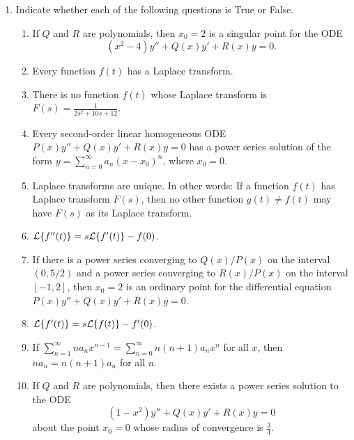 \documentclass[12pt]{article}
\theoremstyle{definition}
\theoremstyle{underl}
\begin{document}
\begin{enumerate}[topsep=0.125in,itemsep=0.375in]
		\item Indicate whether each of the following questions is True or False.
			\begin{enumerate}[itemsep=3mm]		
				\item If $Q$ and $R$ are polynomials, then $x_0=2$ is a singular point for the ODE \[(x^2-4)y''+Q(x)y'+R(x)y=0.\]
				\item Every function $f(t)$ has a Laplace transform.	
				\item There is no function $f(t)$ whose Laplace transform is $F(s)=\frac{1}{2s^2+10s+12}$.
				\item Every second-order linear homogeneous ODE $P(x)y''+Q(x)y'+R(x)y=0$ has a power series solution of the form $y=\sum_{n=0}^\infty a_n(x-x_0)^n$, where $x_0=0$.
				\item Laplace transforms are unique. In other words: If a function $f(t)$ has Laplace transform $F(s)$, then no other function $g(t)\neq f(t)$ may have $F(s)$ as its Laplace transform.
				\item $\mathcal{L}\{f''(t)\}=s\mathcal{L}\{f'(t)\}-f(0)$.
				\item If there is a power series converging to $Q(x)/P(x)$ on the interval $(0,5/2)$ and a power series converging to $R(x)/P(x)$ on the interval $[-1,2]$, then $x_0=2$ is an ordinary point for the differential equation $P(x)y''+Q(x)y'+R(x)y=0$.
				\item $\mathcal{L}\{f'(t)\}=s\mathcal{L}\{f(t)\}-f'(0)$.
				\item If $\sum_{n=1}^\infty na_nx^{n-1}=\sum_{n=0}^\infty n(n+1)a_nx^n$ for all $x$, then $na_n=n(n+1)a_n$ for all $n$.
				\item If $Q$ and $R$ are polynomials, then there exists a power series solution to the ODE \[(1-x^2)y''+Q(x)y'+R(x)y=0\] 
				about the point $x_0=0$ whose radius of convergence is $\frac{3}{4}$.
			\end{enumerate}
		

\end{enumerate}
\end{document}
